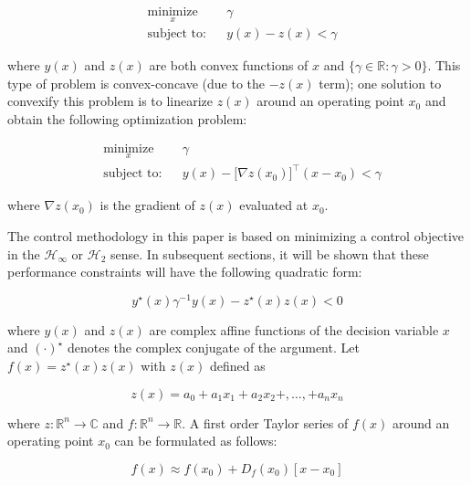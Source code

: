 \documentclass[a4paper, 10pt, conference]{ieeeconf}
\begin{document}
\begin{equation} \label{eq:con_cav}
\begin{aligned}
& \underset{ x }{\text{minimize}}
& & \gamma  \\
& \text{subject to:} & & y(x)-z(x) < \gamma 
\end{aligned}
\end{equation}

where $y(x)$ and $z(x)$ are both convex functions of $x$ and $\{ \gamma \in \mathbb{R} : \gamma > 0\}$. This type of problem is convex-concave (due to the $-z(x)$ term); one solution to convexify this problem is to linearize $z(x)$ around an operating point $x_0$ and obtain the following optimization problem:

\begin{equation} \label{eq:con_lin}
\begin{aligned}
& \underset{ x }{\text{minimize}}
& & \gamma  \\
& \text{subject to:} & & y(x)-\bigl[ \nabla z(x_0) \bigr]^{\top} (x-x_0) < \gamma 
\end{aligned}
\end{equation}

 where $\nabla z(x_0)$ is the gradient of $z(x)$ evaluated at $x_0$. 
 
The control methodology in this paper is based on minimizing a control objective in the $\mathcal{H}_\infty$ or $\mathcal{H}_2$ sense. In subsequent sections, it will be shown that these performance constraints will have the following quadratic form:

\begin{equation} \label{eq:basic_ineq}
y^{\star}(x) \gamma^{-1} y(x) - z^{\star}(x)z(x) < 0 
\end{equation} 

where $y(x)$ and $z(x)$ are complex affine functions of the decision variable $x$ and $(\cdot)^{\star}$ denotes the complex conjugate of the argument. Let $f(x) = z^{\star}(x)z(x)$ with $z(x)$ defined as

$$z(x) = a_0 + a_1x_1 + a_2x_2 + ,\ldots , + a_nx_n$$

where $z:\mathbb{R}^n \rightarrow \mathbb{C}$ and $f:\mathbb{R}^n \rightarrow \mathbb{R}$. A first order Taylor series of $f(x)$ around an operating point $x_0$ can be formulated as follows:

\begin{equation} \label{eq:lin_fx}
f(x) \approx f(x_0) + D_f(x_0)[x-x_0]
\end{equation}
\end{document}
